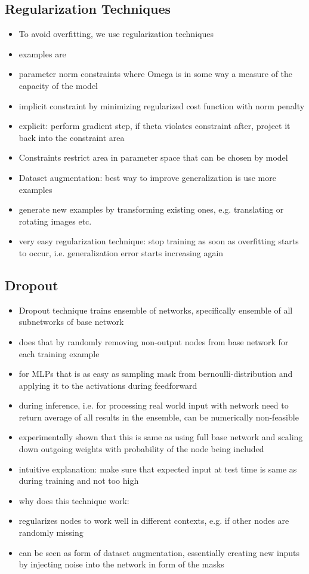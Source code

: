 \documentclass{article}
\begin{document}
\subsection*{Regularization Techniques}
\begin{itemize}
    \item To avoid overfitting, we use regularization techniques
    \item examples are
    \item parameter norm constraints where Omega is in some way a measure of the capacity of the model
    \item implicit constraint by minimizing regularized cost function with norm penalty
    \item explicit: perform gradient step, if theta violates constraint after, project it back into the constraint area
    \item Constraints restrict area in parameter space that can be chosen by model
    \item Dataset augmentation: best way to improve generalization is use more examples
    \item generate new examples by transforming existing ones, e.g. translating or rotating images etc.
    \item very easy regularization technique: stop training as soon as overfitting starts to occur, i.e. generalization error starts increasing again
\end{itemize}

\subsection*{Dropout}
\begin{itemize}
    \item Dropout technique trains ensemble of networks, specifically ensemble of all subnetworks of base network
    \item does that by randomly removing non-output nodes from base network for each training example
    \item for MLPs that is as easy as sampling mask from bernoulli-distribution and applying it to the activations during feedforward
    \item during inference, i.e. for processing real world input with network need to return average of all results in the ensemble, can be numerically non-feasible
    \item experimentally shown that this is same as using full base network and scaling down outgoing weights with probability of the node being included
    \item intuitive explanation: make sure that expected input at test time is same as during training and not too high
    \item why does this technique work:
    \item regularizes nodes to work well in different contexts, e.g. if other nodes are randomly missing
    \item can be seen as form of dataset augmentation, essentially creating new inputs by injecting noise into the network in form of the masks 
\end{itemize}
\end{document}
